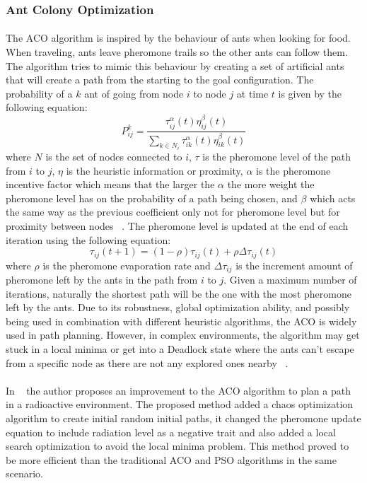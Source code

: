 \subsubsection{Ant Colony Optimization}
\label{subsubsec:ACO}
\paragraph{}The \gls{ACO} algorithm is inspired by the behaviour of ants when looking for food.
When traveling, ants leave pheromone trails so the other ants can follow them. The algorithm tries to mimic this behaviour
by creating a set of artificial ants that will create a path from the starting to the goal configuration. The probability of
a $k$ ant of going from node $i$ to node $j$ at time $t$ is given by the following equation:
\begin{equation}
    P^k_{ij} = \frac{\tau_{ij}^{\alpha}(t)\eta_{ij}^{\beta}(t)}{\sum_{k \in N_{i}}\tau_{ik}^{\alpha}(t)\eta_{ik}^{\beta}(t)}
\end{equation}
where $N$ is the set of nodes connected to $i$, $\tau$ is the pheromone level of the path from $i$ to $j$, $\eta$ is the heuristic information or 
proximity, $\alpha$ is the pheromone incentive factor which means that the larger the $\alpha$ the more weight the pheromone level has
on the probability of a path being chosen, and $\beta$ which acts the same way as the previous coefficient only not for pheromone level
but for proximity between nodes ~\cite{aocet1}. The pheromone level is updated at the end of each iteration using the following equation:
\begin{equation}
    \tau_{ij}(t+1) = (1 - \rho)\tau_{ij}(t) + \rho\Delta\tau_{ij}(t)
\end{equation}
where $\rho$ is the pheromone evaporation rate and $\Delta\tau_{ij}$ is the increment amount of pheromone left by the ants in the path from $i$ to $j$.
Given a maximum number of iterations, naturally the shortest path will be the one with the most pheromone left by the ants.
Due to its robustness, global optimization ability, and possibly being used in combination with different heuristic 
algorithms, the \gls{ACO} is widely used in path planning. However, in complex environments, the algorithm may get stuck in a local minima or get into a 
Deadlock state where the ants can't escape from a specific node as there are not any explored ones nearby ~\cite{aocet2}.

\paragraph{}In ~\cite{XIE2022104076} the author proposes an improvement to the \gls{ACO} algorithm to plan a path in a radioactive environment. 
The proposed method added a chaos optimization algorithm to create initial random initial paths, it changed the pheromone
update equation to include radiation level as a negative trait and also added a local search optimization to avoid the local minima problem. 
This method proved to be more efficient than the traditional \gls{ACO} and \gls{PSO} algorithms in the same scenario. 
